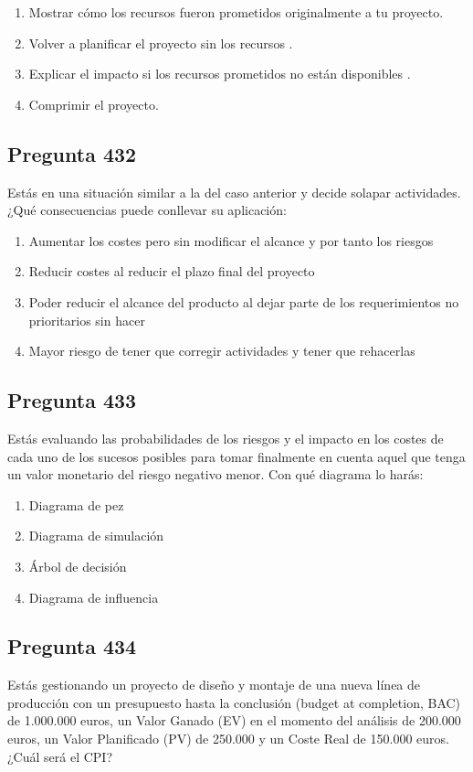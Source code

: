 \documentclass[11pt,a4paper]{article}
\begin{document}
\begin{enumerate}[label=\alph*)]
  \item Mostrar cómo los recursos fueron prometidos originalmente a tu proyecto.
  \item Volver a planificar el proyecto sin los recursos .
  \item Explicar el impacto si los recursos prometidos no están disponibles .
  \item Comprimir el proyecto.
\end{enumerate}

\subsection*{Pregunta 432}
Estás en una situación similar a la del caso anterior y decide solapar actividades. ¿Qué consecuencias puede conllevar su aplicación:

\begin{enumerate}[label=\alph*)]
  \item Aumentar los costes pero sin modificar el alcance y por tanto los riesgos
  \item Reducir costes al reducir el plazo final del proyecto
  \item Poder reducir el alcance del producto al dejar parte de los requerimientos no prioritarios sin hacer
  \item Mayor riesgo de tener que corregir actividades y tener que rehacerlas
\end{enumerate}

\subsection*{Pregunta 433}
Estás evaluando las probabilidades de los riesgos y el impacto en los costes de cada uno de los sucesos posibles para tomar finalmente en cuenta aquel que tenga un valor monetario del riesgo negativo menor. Con qué diagrama lo harás:

\begin{enumerate}[label=\alph*)]
  \item Diagrama de pez
  \item Diagrama de simulación
  \item Árbol de decisión
  \item Diagrama de influencia
\end{enumerate}

\subsection*{Pregunta 434}
Estás gestionando un proyecto de diseño y montaje de una nueva línea de producción con un presupuesto hasta la conclusión (budget at completion, BAC) de 1.000.000 euros, un Valor Ganado (EV) en el momento del análisis de 200.000 euros, un Valor Planificado (PV) de 250.000 y un Coste Real de 150.000 euros. ¿Cuál será el CPI?
\end{document}
